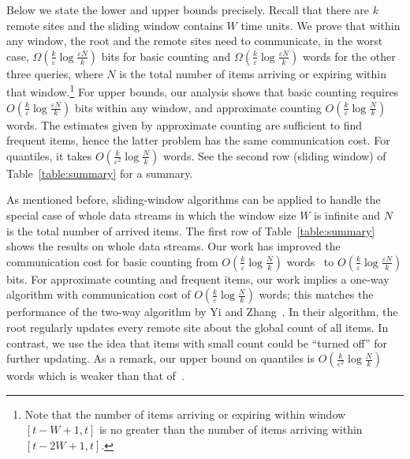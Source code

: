 \documentclass[proceedings]{stacs}
\theoremstyle{definition}\newtheorem{fact}{Fact}
\begin{document}
Below we state the lower and upper bounds precisely.
  {Recall that there are $k$ remote sites and
the sliding window contains $W$ time units.
We prove that}
 {within any window,}
  {the root and the remote sites need to communicate,
in the worst case,
$\Omega(\frac{k}{\varepsilon}\log \frac{\varepsilon N}{k})$
bits  for basic counting
and $\Omega(\frac{k}{\varepsilon}\log \frac{\varepsilon N}{k})$
words for the other three queries, where $N$ is the total number of items
arriving or expiring within that
window.}\footnote{  {Note
that the number of items arriving or expiring within window
$[t-W+1,t]$ is no greater than the number of items arriving within
$[t-2W+1,t]$.}}
For upper bounds, our analysis shows that
basic counting requires $O(\frac{k}{\varepsilon}\log
\frac{\varepsilon N}{k})$ bits within any window,
and approximate counting $O(\frac{k}{\varepsilon} \log \frac{N}{k})$ words.
The estimates given by approximate counting are
sufficient to find frequent items, hence the latter problem
has the same communication cost.
For quantiles, it takes $O(\frac{k}{\varepsilon^2}\log \frac{N}{k})$ words.
See the second row (sliding window)
of Table~\ref{table:summary} for a summary.


As mentioned before, sliding-window algorithms can be
applied to handle the special case of whole data streams
  {in which the window size $W$ is infinite and $N$
  is the total number of arrived items.}
The first row of Table~\ref{table:summary} shows
the results on whole data streams.
Our work has improved the communication cost for
basic counting from $O( \frac{k}{\varepsilon}\log \frac{N}{k})$
words~\cite{KeralapuraCR06}
to $O(\frac{k}{\varepsilon}\log\frac{\varepsilon N}{k})$ bits.
For approximate counting and frequent items, our work implies
a one-way algorithm with communication cost of
$O(\frac{k}{\varepsilon} \log \frac{N}{k})$
words; this matches the performance of
the two-way algorithm by Yi and Zhang~\cite{YiZ08}.
In their algorithm, the root
regularly updates every remote site about the global count of all items.
In contrast,
we use the idea that items with small count could
be ``turned off'' for further updating.
As a remark, our upper bound on quantiles is
$O(\frac{k}{\varepsilon^2} \log \frac{N}{k})$ words
which is weaker than that of~\cite{YiZ08}.
\end{document}
